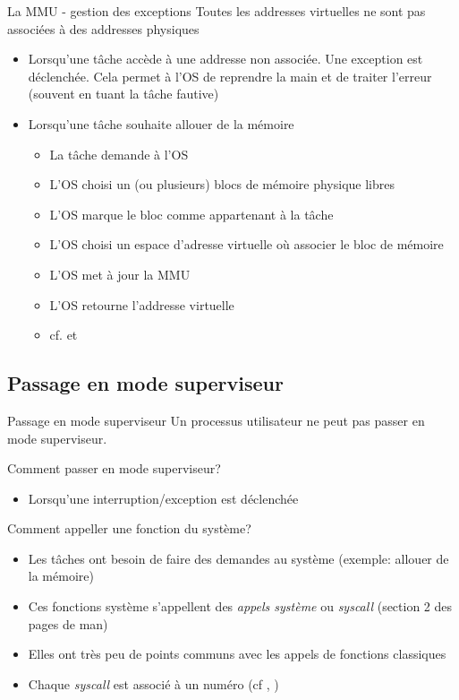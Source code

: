 \begin{frame}{La MMU - gestion des exceptions}
  Toutes  les  addresses  virtuelles  ne  sont  pas  associées  à  des
  addresses physiques
  \begin{itemize}
  \item  Lorsqu'une tâche  accède à  une addresse  non  associée.  Une
    exception est déclenchée.  Cela permet à l'OS de reprendre la main
    et de traiter l'erreur (souvent en tuant la tâche fautive)
  \item Lorsqu'une tâche souhaite allouer de la mémoire
    \begin{itemize}
    \item  La tâche demande à l'OS
    \item  L'OS choisi  un (ou  plusieurs) blocs  de  mémoire physique
      libres
    \item L'OS marque le bloc comme appartenant à la tâche
    \item  L'OS choisi un  espace d'adresse  virtuelle où  associer le
      bloc de mémoire
    \item L'OS met à jour la MMU
    \item L'OS retourne l'addresse virtuelle
    \item cf.  et 
    \end{itemize}
  \end{itemize}
\end{frame}

\subsection {Passage en mode superviseur}

\begin{frame}{Passage en mode superviseur}
  Un processus utilisateur ne peut pas passer en mode superviseur.

  Comment passer en mode superviseur?
  \begin{itemize}
  \item Lorsqu'une interruption/exception est déclenchée
  \end{itemize}

  Comment appeller une fonction du système?
  \begin{itemize}
  \item  Les  tâches ont  besoin  de  faire  des demandes  au  système
    (exemple: allouer de la mémoire)
  \item Ces fonctions système s'appellent des \emph{appels système} ou
    \emph{syscall} (section 2 des pages de man)
  \item  Elles ont  très  peu de  points  communs avec  les appels  de
    fonctions classiques
  \item   Chaque  \emph{syscall}   est   associé  à   un  numéro   (cf
     , )
  \end{itemize}

\end{frame}

